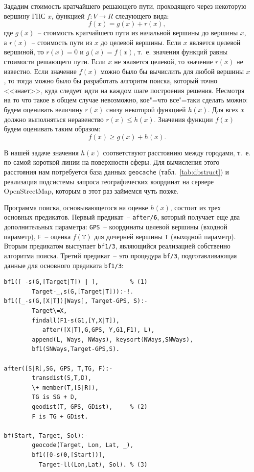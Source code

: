 \documentclass[a4paper,14pt, openany, twoside, final]{extbook} %
\begin{document}
Зададим стоимость кратчайшего решающего пути, проходящего через некоторую вершину ГПС $x$, функцией $f\!\!:V\to R$ следующего вида:
\begin{equation}
  \label{eq:1}
  f(x)=g(x)+r(x),
\end{equation}
где $g(x)$~-- стоимость кратчайшего пути из начальной вершины до вершины $x$, а $r(x)$~-- стоимость пути из $x$ до целевой вершины.  Если $x$ является целевой вершиной, то $r(x)=0$ и $g(x)=f(x)$, т.~е. значения функций равны стоимости решающего пути.  Если $x$ не является целевой, то значение $r(x)$ не известно.  Если значение $f(x)$ можно было бы вычислить для любой вершины $x$, то тогда можно было бы разработать алгоритм поиска, который точно <<знает>>, куда следует идти на каждом шаге построения решения.  Несмотря на то что такое в общем случае невозможно, кое"=что все"=таки сделать можно: будем оценивать величину $r(x)$ снизу некоторой функцией $h(x)$.  Для всех $x$ должно выполняться неравенство $r(x)\leqslant h(x)$.  Значения функции $f(x)$ будем оценивать таким образом:
\begin{equation}
  \label{eq:2}
  f(x)\geqslant g(x)+h(x).
\end{equation}

В нашей задаче значения $h(x)$ соответствуют расстоянию между городами, т.~е. по самой короткой линии на поверхности сферы.  Для вычисления этого расстояния нам потребуется база данных \texttt{geocache} (табл.~\ref{tab:dbstruct}) и реализация подсистемы запроса географических координат на сервере \foreignlanguage{english}{OpenStreetMap}, которым в этот раз займемся чуть позже.

Программа поиска, основывающегося на оценке $h(x)$, состоит из трех основных предикатов.  Первый предикат~-- \texttt{after/6}, который получает еще два дополнительных параметра: \texttt{GPS}~-- координаты целевой вершины (входной параметр), \texttt{F}~-- оценка $f(\mathtt{T})$ для дочерней вершины \texttt{T} (выходной параметр).  Вторым предикатом выступает \texttt{bf1/3}, являющийся реализацией собственно алгоритма поиска.  Третий предикат~-- это процедура \texttt{bf/3}, подготавливающая данные для основного предиката \texttt{bf1/3}:

\begin{verbatim}
bf1([_-s(G,[Target|T]) |_],         % (1)
        Target-_,s(G,[Target|T])):-!.
bf1([_-s(G,[X|T])|Ways], Target-GPS, S):-
        Target\=X,
        findall(F1-s(G1,[Y,X|T]),
           after([X|T],G,GPS, Y,G1,F1), L),
        append(L, Ways, NWays), keysort(NWays,SNWays),
        bf1(SNWays,Target-GPS,S).

after([S|R],SG, GPS, T,TG, F):-
        transdist(S,T,D),
        \+ member(T,[S|R]),
        TG is SG + D,
        geodist(T, GPS, GDist),     % (2)
        F is TG + GDist.

bf(Start, Target, Sol):-
        geocode(Target, Lon, Lat, _),
        bf1([0-s(0,[Start])],
          Target-ll(Lon,Lat), Sol). % (3)
\end{verbatim}
\end{document}
